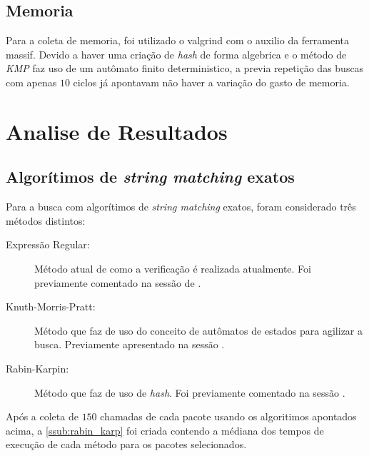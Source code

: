 \section{Memoria}

Para a coleta de memoria, foi utilizado o {\code valgrind} com o auxilio da ferramenta {\code massif}. Devido a haver uma criação de \textit{hash} de forma  algebrica e o método de \textit{KMP} faz uso de um autômato finito deterministico, a previa repetição das buscas com apenas $10$ ciclos já apontavam não haver a variação do gasto de memoria.


\chapter{Analise de Resultados} %
\label{cha:analise_de_resultados}

\section{Algorítimos de \textit{string matching} exatos} %
\label{sec:algor_timos_de_string_matching_exatos}

Para a busca com algorítimos de \textit{string matching} exatos, foram considerado três métodos distintos:

\begin{description}
	\item[Expressão Regular:] Método atual de como a verificação é realizada atualmente. Foi previamente comentado na sessão de .
	\item[Knuth-Morris-Pratt:] Método que faz de uso do conceito de autômatos de estados para agilizar a busca. Previamente apresentado na sessão .
	\item[Rabin-Karpin:]  Método que faz de uso de \textit{hash}. Foi previamente comentado na sessão .
\end{description}

Após a coleta de $150$ chamadas de cada pacote usando os algoritimos apontados acima, a \autoref{ssub:rabin_karp} foi criada contendo a médiana dos tempos de execução de cada método para os pacotes selecionados.

